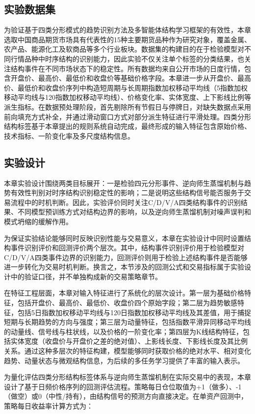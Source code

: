 \subsection{实验数据集}
为验证基于四类分形模式的趋势识别方法及多智能体结构学习框架的有效性，本章选取中国商品期货市场具有代表性的15种主要期货品种作为研究对象，覆盖金属、农产品、能源化工及软商品等多个行业板块。数据集的构建目的在于检验模型对不同行情品种中时序结构的识别能力，因此实验不仅关注单个标签的分类结果，也关注结构事件在不同市场状态下的稳定性。所有数据均来自公开市场的日度行情，包含开盘价、最高价、最低价和收盘价等基础价格字段。本章进一步从开盘价、最高价、最低价和收盘价序列中构造短周期与长周期指数加权移动平均线（5指数加权移动平均线与120指数加权移动平均线）、价格变化率、实体宽度、上下影线比例等派生指标。在数据预处理阶段，首先剔除所有节假日与停牌日，对缺失数据点采用前向填充方式补全，并通过滑动窗口方式对部分派生特征进行平滑处理。四类分形结构标签基于本章提出的规则系统自动完成，最终形成的输入特征包含原始价格、技术指标、一阶变化率及多尺度结构信息。

\subsection{实验设计}
本章实验设计围绕两类目标展开：一是检验四元分形事件、逆向师生蒸馏机制与趋势有效性判别对时序结构识别稳定性的影响；二是说明这些结构信号能否服务于交易流程中的时机判断。因此，实验评价同时关注C/D/V/A四类结构事件的识别结果、不同模型预训练方式对结构边界的影响，以及逆向师生蒸馏机制对噪声误判和模式坍缩的缓解作用。

为保证实验结论能够同时反映识别性能与交易意义，本章在实验设计中同时设置结构事件识别评价和回测评价两个层次。其中，结构事件识别评价用于检验模型对C/D/V/A四类事件边界的识别能力，回测评价则用于检验上述结构事件是否能够进一步转化为交易时机判断。换言之，本节涉及的回测公式和交易指标属于实验设计中的验证口径，并不单独构成新的交易策略章节。

在特征工程层面，本章对输入特征进行了系统化的层次设计。第一层为基础价格特征，包括开盘价、最高价、最低价、收盘价四个原始字段；第二层为趋势敏感特征，包括5日指数加权移动平均线与120日指数加权移动平均线及其差值，用于捕捉短期与长期趋势的方向与强度；第三层为动量特征，包括指数平滑异同移动平均线的动量线、信号线与柱状线，以及价格的一阶变化率；第四层为K线结构特征，包括实体宽度（收盘价与开盘价之差的绝对值）、上影线长度、下影线长度及其比例关系。通过这种多层次的特征构建，模型能够同时获取价格的绝对水平、相对变化趋势、动量状态与微观结构信息，为后续的多任务学习提供了丰富的输入表示。

为量化评估四类分形结构标签体系与逆向师生蒸馏机制在实际交易中的表现，本章设计了基于日频价格序列的回测评估流程。策略每日仓位取值为+1（做多）、-1（做空）或0（中性/持有），由结构信号的预测方向直接决定。在单资产回测中，策略每日收益率计算方式为：

